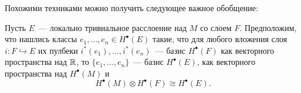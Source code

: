  	 Похожими техниками можно получить следующее важное обобщение: 

 	 \begin{theorem} 
 	 		Пусть $E$~--- локально тривиальное расслоение над $M$ со слоем $F$. Предположим, что нашлись классы $e_1, \ldots, e_n \in H^{\bullet}(E)$ такие, что для любого вложения слоя $i\colon F \hookrightarrow E$ их пулбеки $i^*(e_1), \ldots, i^*(e_n)$~--- базис $H^{\bullet}(F)$ как векторного пространства над $\mathbb{R}$, то $\{ e_1, \ldots, e_n \}$~--- базис $H^{\bullet}(E)$, как векторного пространства над $H^{\bullet}(M)$ и 
 	 		\[
 	 			H^{\bullet}(M) \otimes H^{\bullet}(F) \cong H^{\bullet}(E).
 	 		\]
 	 \end{theorem}

 	 

 	
